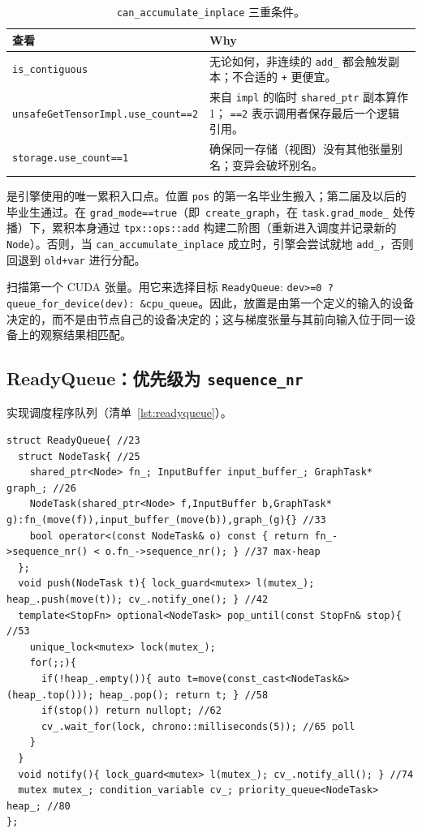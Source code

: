 \begin{table}[H]
\centering
\caption{\texttt{can\_accumulate\_inplace} 三重条件。}
\label{tab:inplace}
\small
\begin{tabular}{ll}
\toprule
查看 & Why \\
\midrule
\texttt{is\_contiguous} & 无论如何，非连续的 \texttt{add\_} 都会触发副本；不合适的 \texttt{+} 更便宜。 \\
\texttt{unsafeGetTensorImpl.use\_count==2} & 来自 \texttt{impl} 的临时 \texttt{shared\_ptr} 副本算作 1； \texttt{==2} 表示调用者保存最后一个逻辑引用。 \\
\texttt{storage.use\_count==1} & 确保同一存储（视图）没有其他张量别名；变异会破坏别名。 \\
\bottomrule
\end{tabular}
\end{table}

是引擎使用的唯一累积入口点。位置 \texttt{pos} 的第一名毕业生搬入；第二届及以后的毕业生通过。在 \texttt{grad\_mode==true}（即\ \texttt{create\_graph}，在 \texttt{task.grad\_mode\_} 处传播）下，累积本身通过 \texttt{tpx::ops::add} 构建二阶图（重新进入调度并记录新的 \texttt{Node}）。否则，当 \texttt{can\_accumulate\_inplace} 成立时，引擎会尝试就地 \texttt{add\_}，否则回退到 \texttt{old+var} 进行分配。

扫描第一个 CUDA 张量。用它来选择目标 \texttt{ReadyQueue}: \texttt{dev>=0 ? queue\_for\_device(dev): \&cpu\_queue}。因此，放置是由第一个定义的输入的设备决定的，而不是由节点自己的设备决定的；这与梯度张量与其前向输入位于同一设备上的观察结果相匹配。

\subsection{ReadyQueue：优先级为 \texttt{sequence\_nr}}
\label{subsec:readyqueue}

实现调度程序队列（清单~\ref{lst:readyqueue}）。

\begin{lstlisting}[caption={priority queue.}, label=lst:readyqueue]
struct ReadyQueue{ //23
  struct NodeTask{ //25
    shared_ptr<Node> fn_; InputBuffer input_buffer_; GraphTask* graph_; //26
    NodeTask(shared_ptr<Node> f,InputBuffer b,GraphTask* g):fn_(move(f)),input_buffer_(move(b)),graph_(g){} //33
    bool operator<(const NodeTask& o) const { return fn_->sequence_nr() < o.fn_->sequence_nr(); } //37 max-heap
  };
  void push(NodeTask t){ lock_guard<mutex> l(mutex_); heap_.push(move(t)); cv_.notify_one(); } //42
  template<StopFn> optional<NodeTask> pop_until(const StopFn& stop){ //53
    unique_lock<mutex> lock(mutex_);
    for(;;){
      if(!heap_.empty()){ auto t=move(const_cast<NodeTask&>(heap_.top())); heap_.pop(); return t; } //58
      if(stop()) return nullopt; //62
      cv_.wait_for(lock, chrono::milliseconds(5)); //65 poll
    }
  }
  void notify(){ lock_guard<mutex> l(mutex_); cv_.notify_all(); } //74
  mutex mutex_; condition_variable cv_; priority_queue<NodeTask> heap_; //80
};
\end{lstlisting}

